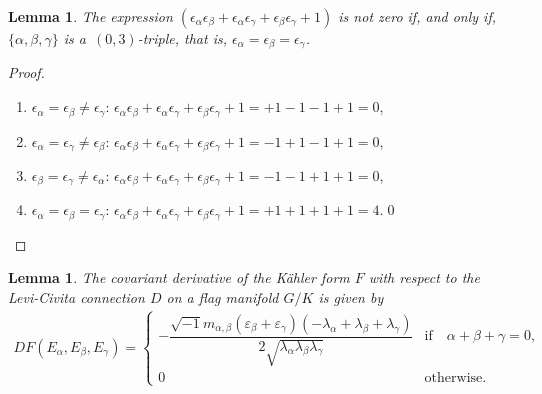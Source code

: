 \documentclass[10pt,a4paper]{amsart}
\numberwithin{equation}{section}
\newtheorem{Lemma}[Theorem]{Lemma}
\begin{document}
\begin{Lemma}
The expression $(\epsilon_{\alpha}\epsilon_{\beta}+\epsilon_{\alpha}\epsilon_{\gamma}+\epsilon_{\beta}\epsilon_{\gamma}+1)$ is not zero if, and only if, $\{\alpha, \beta, \gamma\}$ is a~$(0,3)$-triple, that is, $\epsilon_{\alpha}=\epsilon_{\beta}=\epsilon_{\gamma}$.
\end{Lemma}
\begin{proof}\quad
\begin{enumerate}\itemsep=0pt
\item[$(i)$]
$\epsilon_{\alpha}=\epsilon_{\beta}\neq \epsilon_{\gamma}$:\quad
$\epsilon_{\alpha}\epsilon_{\beta}+\epsilon_{\alpha}\epsilon_{\gamma} +\epsilon_{\beta}\epsilon_{\gamma}+1=+1-1-1+1=0$,

\item[$(ii)$] $\epsilon_{\alpha}=\epsilon_{\gamma}\neq \epsilon_{\beta}$:\quad
$\epsilon_{\alpha}\epsilon_{\beta}+\epsilon_{\alpha}\epsilon_{\gamma} +\epsilon_{\beta}\epsilon_{\gamma}+1=-1+1-1+1=0$,

\item[$(iii)$] $\epsilon_{\beta}=\epsilon_{\gamma}\neq \epsilon_{\alpha}$:\quad
$\epsilon_{\alpha}\epsilon_{\beta}+\epsilon_{\alpha}\epsilon_{\gamma} +\epsilon_{\beta}\epsilon_{\gamma}+1=-1-1+1+1=0$,

\item[$(iv)$] $\epsilon_{\alpha}=\epsilon_{\beta}=\epsilon_{\gamma}$:\quad
$\epsilon_{\alpha}\epsilon_{\beta}+\epsilon_{\alpha}\epsilon_{\gamma} +\epsilon_{\beta}\epsilon_{\gamma}+1=+1+1+1+1=4$.\hfill \qed
\end{enumerate}\renewcommand{\qed}{}
\end{proof}

\begin{Lemma}
The covariant derivative of the K\"ahler form $F$ with respect to the Levi-Civita connection $D$ on a flag manifold $G/K$ is given by
\begin{gather*}
DF(E_{\alpha},E_{\beta},E_{\gamma})=
\begin{cases}
-\dfrac{\sqrt{-1}m_{\alpha,\beta}(\varepsilon_{\beta}+\varepsilon_{\gamma})(-\lambda_{\alpha} +\lambda_{\beta}+\lambda_{\gamma})}{2\sqrt{\lambda_{\alpha}\lambda_{\beta}\lambda_{\gamma}}}
&\text{if}\quad \alpha+\beta+\gamma = 0,
\\
0 &\text{otherwise}.
\end{cases}
\end{gather*}
\end{Lemma}
\end{document}
